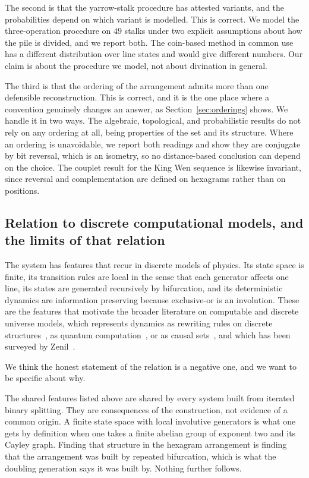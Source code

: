 \documentclass[11pt,a4paper]{article}
\begin{document}
The second is that the yarrow-stalk procedure has attested variants, and the
probabilities depend on which variant is modelled. This is correct. We model the
three-operation procedure on $49$ stalks under two explicit assumptions about how
the pile is divided, and we report both. The coin-based method in common use has
a different distribution over line states and would give different numbers. Our
claim is about the procedure we model, not about divination in general.

The third is that the ordering of the arrangement admits more than one defensible
reconstruction. This is correct, and it is the one place where a convention
genuinely changes an answer, as Section~\ref{sec:orderings} shows. We handle it
in two ways. The algebraic, topological, and probabilistic results do not rely on
any ordering at all, being properties of the set and its structure. Where an
ordering is unavoidable, we report both readings and show they are conjugate by
bit reversal, which is an isometry, so no distance-based conclusion can depend on
the choice. The couplet result for the King Wen sequence is likewise invariant,
since reversal and complementation are defined on hexagrams rather than on
positions.

\subsection{Relation to discrete computational models, and the limits of that
relation}
\label{sec:scope}

The system has features that recur in discrete models of physics. Its state space
is finite, its transition rules are local in the sense that each generator
affects one line, its states are generated recursively by bifurcation, and its
deterministic dynamics are information preserving because exclusive-or is an
involution. These are the features that motivate the broader literature on
computable and discrete universe models, which represents dynamics as rewriting
rules on discrete structures~\cite{wolfram2002new,gorard2020relativistic},
as quantum computation~\cite{lloyd2005computational}, or as causal
sets~\cite{sorkin2005causal}, and which has been surveyed by
Zenil~\cite{zenil2012introducing}.

We think the honest statement of the relation is a negative one, and we want to
be specific about why.

The shared features listed above are shared by every system built from iterated
binary splitting. They are consequences of the construction, not evidence of a
common origin. A finite state space with local involutive generators is what one
gets by definition when one takes a finite abelian group of exponent two and its
Cayley graph. Finding that structure in the hexagram arrangement is finding that
the arrangement was built by repeated bifurcation, which is what the doubling
generation says it was built by. Nothing further follows.
\end{document}
